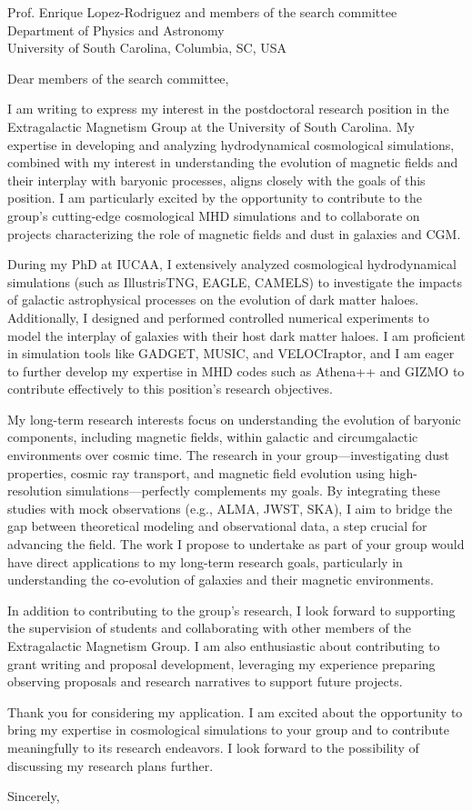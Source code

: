 \documentclass[11pt]{letter}
\begin{document}
\begin{letter}{Prof. Enrique Lopez-Rodriguez and members of the search committee \\ Department of Physics and Astronomy \\ University of South Carolina, Columbia, SC, USA}

\opening{Dear members of the search committee,}

I am writing to express my interest in the postdoctoral research position in the Extragalactic Magnetism Group at the University of South Carolina. My expertise in developing and analyzing hydrodynamical cosmological simulations, combined with my interest in understanding the evolution of magnetic fields and their interplay with baryonic processes, aligns closely with the goals of this position. I am particularly excited by the opportunity to contribute to the group's cutting-edge cosmological MHD simulations and to collaborate on projects characterizing the role of magnetic fields and dust in galaxies and CGM.

During my PhD at IUCAA, I extensively analyzed cosmological hydrodynamical simulations (such as IllustrisTNG, EAGLE, CAMELS) to investigate the impacts of  galactic astrophysical processes on the evolution of dark matter haloes. Additionally, I designed and performed controlled numerical experiments to model the interplay of galaxies with their host dark matter haloes. I am proficient in simulation tools like GADGET, MUSIC, and VELOCIraptor, and I am eager to further develop my expertise in MHD codes such as Athena++ and GIZMO to contribute effectively to this position’s research objectives.

My long-term research interests focus on understanding the evolution of baryonic components, including magnetic fields, within galactic and circumgalactic environments over cosmic time. The research in your group—investigating dust properties, cosmic ray transport, and magnetic field evolution using high-resolution simulations—perfectly complements my goals. By integrating these studies with mock observations (e.g., ALMA, JWST, SKA), I aim to bridge the gap between theoretical modeling and observational data, a step crucial for advancing the field. The work I propose to undertake as part of your group would have direct applications to my long-term research goals, particularly in understanding the co-evolution of galaxies and their magnetic environments.

In addition to contributing to the group's research, I look forward to supporting the supervision of students and collaborating with other members of the Extragalactic Magnetism Group. I am also enthusiastic about contributing to grant writing and proposal development, leveraging my experience preparing observing proposals and research narratives to support future projects.

Thank you for considering my application. I am excited about the opportunity to bring my expertise in cosmological simulations to your group and to contribute meaningfully to its research endeavors. I look forward to the possibility of discussing my research plans further.

\closing{Sincerely,}

\end{letter}
\end{document}
